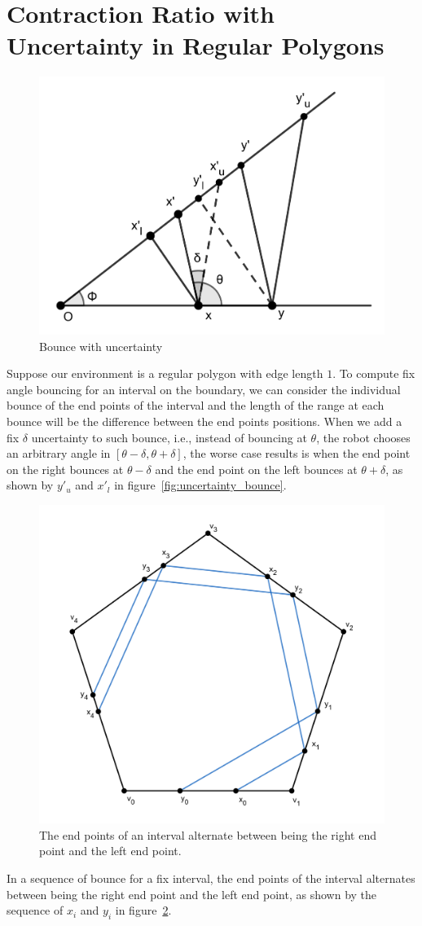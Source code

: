 \documentclass[11pt]{article}%
\begin{document}
\section{Contraction Ratio with Uncertainty in Regular Polygons}

\begin{figure}[!h]
  \centering
  \includegraphics[width=0.5\linewidth]{uncertainty_bounce.png}
  \caption{Bounce with uncertainty}
  \label{fig:uncertain_bounce}
\end{figure}
Suppose our environment is a regular polygon with edge length $1$. To compute fix angle bouncing for an interval on the boundary, we can consider the individual bounce of the end points of the interval and the length of the range at each bounce will be the difference between the end points positions. When we add a fix $\delta$ uncertainty to such bounce, i.e., instead of bouncing at $\theta$, the robot chooses an arbitrary angle in $[\theta - \delta, \theta + \delta]$, the worse case results is when the end point on the right bounces at $\theta - \delta$ and the end point on the left bounces at $\theta + \delta$, as shown by $y'_u$ and $x'_l$ in figure~\ref{fig:uncertainty_bounce}. 
\begin{figure}[!h]
  \centering
  \includegraphics[width=0.5\linewidth]{alternate_side.png}
  \caption{The end points of an interval alternate between being the right end point and the left end point.}
  \label{fig:alternate_side}
\end{figure}
In a sequence of bounce for a fix interval, the end points of the interval alternates between being the right end point and the left end point, as shown by the sequence of $x_i$ and $y_i$ in figure~\ref{fig:alternate_side}.
\end{document}
